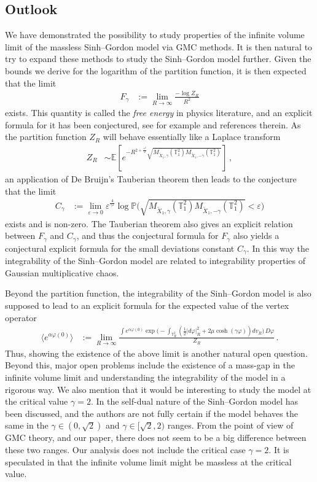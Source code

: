 \documentclass[11pt]{article}
\numberwithin{equation}{section}
\newcounter{exa}
\newcounter{conj}
\theoremstyle{definition}
\renewcommand{\tilde}{\widetilde}          %
\newcommand{\E}{\mathbb{E}}
\renewcommand{\P}{\mathbb{P}}
\def\eps{\varepsilon}
\def\T{\mathbb{T}}
\newcommand{\ab}{|}
\newcommand{\Pb}{\P}
\newcommand{\tor}{{\T_1^2}}
\newcommand{\toR}{{\T_R^2}}
\begin{document}
\subsection{Outlook} We have demonstrated the possibility to study properties of the infinite volume limit of the massless Sinh--Gordon model via GMC methods. It is then natural to try to expand these methods to study the Sinh--Gordon model further. Given the bounds we derive for the logarithm of the partition function, it is then expected that the limit
\begin{align*}
F_\gamma &:= \lim_{R \to \infty} \frac{- \log Z_R}{R^2}
\end{align*}
exists. This quantity is called the \emph{free energy} in physics literature, and an explicit formula for it has been conjectured, see for example \cite{FLZZ, til} and references therein. As the partition function $Z_R$ will behave essentially like a  Laplace transform
\begin{align*}
Z_R &\sim \E[e^{- R^{2 + \frac{\gamma^2}{2}} \sqrt{M_{\tilde X_1,\gamma}(\tor) M_{\tilde X_1,-\gamma}(\tor)  } }]\,,
\end{align*}
an application of De Bruijn's Tauberian theorem then leads to the conjecture that the limit
\begin{align*}
C_\gamma &:= \lim_{\eps \to 0} \eps^{\frac{4}{\gamma^2}} \log \Pb \big( \sqrt{M_{\tilde X_1,\gamma}(\tor) M_{\tilde X_1,-\gamma}(\tor)  } \less \eps \big)
\end{align*}
exists and is non-zero. The Tauberian theorem also gives an explicit relation between $F_\gamma$ and $C_\gamma$, and thus the conjectural formula for $F_\gamma$ also yields a conjectural explicit formula for the small deviations constant $C_\gamma$. In this way the integrability of the Sinh--Gordon model are related to integrability properties of Gaussian multiplicative chaos.


Beyond the partition function, the integrability of the Sinh--Gordon model is also supposed to lead to an explicit formula for the expected value of the vertex operator 
\begin{align*}
\langle e^{\alpha \varphi(0)} \rangle &:=  \lim_{R \to \infty} \frac{\int e^{\alpha \varphi(0)} \exp \big(- \int_{\toR} ( \tfrac 12 \ab d \varphi \ab_R^2  + 2 \mu \cosh(\gamma \varphi ) ) dv_{R} \big) \, D \varphi}{Z_R}\,.
\end{align*}
Thus, showing the existence of the above limit is another natural open question. Beyond this, major open problems include the existence of a mass-gap in the infinite volume limit and understanding the integrability of the model in a rigorous way. We also mention that it would be interesting to study the model at the critical value $\gamma=2$. In \cite{BLC,til} the self-dual nature of the Sinh--Gordon model has been discussed, and the authors are not fully certain if the model behaves the same in the $\gamma \in(0,\sqrt{2})$ and $\gamma \in [\sqrt{2},2)$ ranges. From the point of view of GMC theory, and our paper, there does not seem to be a big difference between these two ranges. Our analysis does not include the critical case $\gamma=2$. It is speculated in \cite{BLC} that the infinite volume limit might be massless at the critical value.
\end{document}
